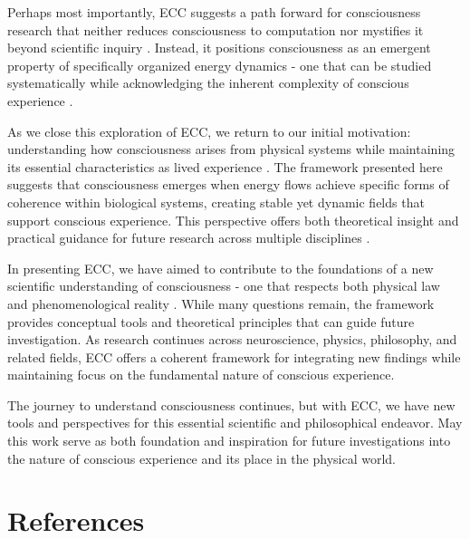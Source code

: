 \begin{refsection}
Perhaps most importantly, ECC suggests a path forward for consciousness research that neither reduces consciousness to computation nor mystifies it beyond scientific inquiry \cite{chalmers2010character}. Instead, it positions consciousness as an emergent property of specifically organized energy dynamics - one that can be studied systematically while acknowledging the inherent complexity of conscious experience \cite{seth2021being}.

As we close this exploration of ECC, we return to our initial motivation: understanding how consciousness arises from physical systems while maintaining its essential characteristics as lived experience \cite{goff2019galileo}. The framework presented here suggests that consciousness emerges when energy flows achieve specific forms of coherence within biological systems, creating stable yet dynamic fields that support conscious experience. This perspective offers both theoretical insight and practical guidance for future research across multiple disciplines \cite{thompson2014waking}.

In presenting ECC, we have aimed to contribute to the foundations of a new scientific understanding of consciousness - one that respects both physical law and phenomenological reality \cite{dennett2017bacteria}. While many questions remain, the framework provides conceptual tools and theoretical principles that can guide future investigation. As research continues across neuroscience, physics, philosophy, and related fields, ECC offers a coherent framework for integrating new findings while maintaining focus on the fundamental nature of conscious experience.

The journey to understand consciousness continues, but with ECC, we have new tools and perspectives for this essential scientific and philosophical endeavor. May this work serve as both foundation and inspiration for future investigations into the nature of conscious experience and its place in the physical world.

\newpage
\section{References}
\printbibliography[title={},heading=subbibliography]
\end{refsection}